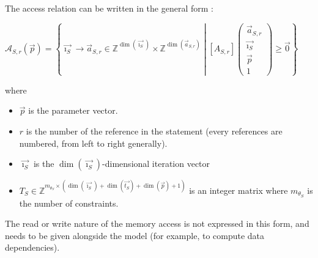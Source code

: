 \documentclass[paper=a4, fontsize=11.5pt]{scrartcl}
\numberwithin{equation}{section}        %
\numberwithin{figure}{section}          %
\numberwithin{table}{section}               %
\begin{document}
        The access relation can be written in the general form :
        \begin{center}
            $\mathcal{A}_{S,r}(\vec{p}) = 
            \left\{
                \vec{\imath_S} \to \vec{a}_{S,r} \in \mathbb{Z}^{\dim(\vec{\imath_S})}\times\mathbb{Z}^{\dim(\vec{a}_{S,r})}
                \middle|
                \left[A_{S,r}\right]\left(\begin{array}{c}\vec{a}_{S,r}\\\vec{\imath_S}\\\vec{p}\\1\end{array}\right)
                \geq \vec{0}
            \right\}$
        \end{center}
        where 
        \begin{itemize}
            \item $\vec{p}$ is the parameter vector.
            \item $r$ is the number of the reference in the statement (every references are
                numbered, from left to right generally).
            \item $\vec{\imath_S}$ is the $\dim(\vec{\imath_S})$-dimensional iteration vector
            \item $T_S \in \mathbb{Z}^{m_{\theta_S}\times(\dim(\vec{\imath_S})+\dim(\vec{t_S})+\dim(\vec{p})+1)}$
                is an integer matrix where $m_{\theta_S}$ is the number of constraints.
        \end{itemize}

        The read or write nature of the memory access is not expressed in this form,
        and needs to be given alongside the model (for example, to compute data dependencies).

\end{document}
